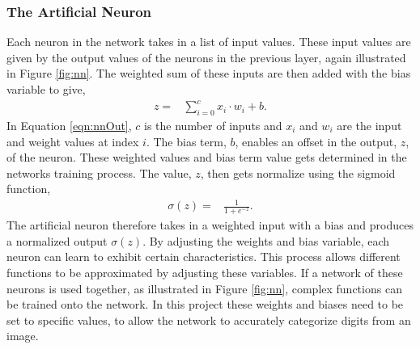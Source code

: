 \subsubsection{The Artificial Neuron}
Each neuron in the network takes in a list of input values. These input values are given by the output values of the neurons in the previous layer, again illustrated in Figure \ref{fig:nn}. The weighted sum of these inputs are then added with the bias variable to give,
\begin{align}
  z =  &\displaystyle{\sum_{i=0}^{c} x_{i}\cdot w_{i} + b}.
\label{eqn:nnOut}
\end{align}
In Equation \ref{eqn:nnOut}, $c$ is the number of inputs and $x_{i}$ and $w_{i}$ are the input and weight values at index $i$. The bias term, $b$, enables an offset in the output, $z$, of the neuron. These weighted values and bias term value gets determined in the networks training process. The value, $z$, then gets normalize using the sigmoid function,
\begin{align}
  \sigma(z) =  &\displaystyle{\frac{1}{1 + e^{-z}}}.
\label{eqn:sigmoid}
\end{align}
The artificial neuron therefore takes in a weighted input with a bias and produces a normalized output $\sigma(z)$. By adjusting the weights and bias variable, each neuron can learn to exhibit certain characteristics. This process allows different functions to be approximated by adjusting these variables. If a network of these neurons is used together, as illustrated in Figure \ref{fig:nn}, complex functions can be trained onto the network. In this project these weights and biases need to be set to specific values, to allow the network to accurately categorize digits from an image.

